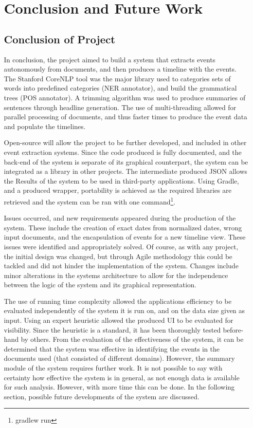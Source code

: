 \chapter{Conclusion and Future Work}

\section{Conclusion of Project}
\par In conclusion, the project aimed to build a system that extracts events autonomously from documents, and then produces a timeline with the events. The Stanford CoreNLP tool was the major library used to categories sets of words into predefined categories (NER annotator), and build the grammatical trees (POS annotator). A trimming algorithm was used to produce summaries of sentences through headline generation. The use of multi-threading allowed for parallel processing of documents, and thus faster times to produce the event data and populate the timelines. 

\par Open-source will allow the project to be further developed, and included in other event extraction systems.  Since the code produced is fully documented, and the back-end of the system is separate of its graphical counterpart, the system can be integrated as a library in other projects. The intermediate produced JSON allows the Results of the system to be used in third-party applications. Using Gradle, and a produced wrapper, portability is achieved as the required libraries are retrieved and the system can be ran with one command\footnote{gradlew run}. 

\par Issues occurred, and new requirements appeared during the production of the system. These include the creation of exact dates from normalized dates, wrong input documents, and the encapsulation of events for a new timeline view. These issues were identified and appropriately solved. Of course, as with any project, the initial design was changed, but through Agile methodology this could be tackled and did not hinder the implementation of the system. Changes include minor alterations in the systems architecture to allow for the independence between the logic of the system and its graphical representation.

\par The use of running time complexity allowed the applications efficiency to be evaluated independently of the system it is run on, and on the data size given as input. Using an expert heuristic allowed the produced UI to be evaluated for visibility. Since the heuristic is a standard, it has been thoroughly tested before-hand by others. From the evaluation of the effectiveness of the system, it can be determined that the system was effective in identifying the events in the documents used (that consisted of different domains). However, the summary module of the system requires further work. It is not possible to say with certainty how effective the system is in general, as not enough data is available for such analysis. However, with more time this can be done. In the following section, possible future developments of the system are discussed.

